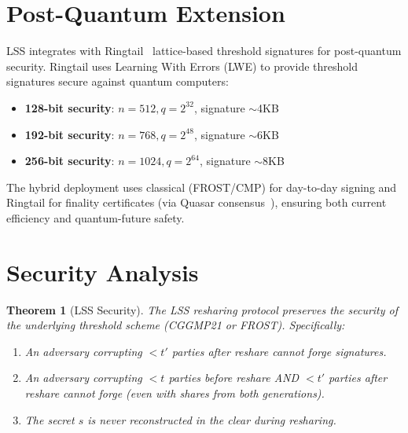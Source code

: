 \documentclass[11pt]{article}
\newtheorem{theorem}{Theorem}
\begin{document}
\section{Post-Quantum Extension}

LSS integrates with Ringtail~\cite{ringtail} lattice-based threshold signatures for post-quantum security. Ringtail uses Learning With Errors (LWE) to provide threshold signatures secure against quantum computers:

\begin{itemize}[nosep]
  \item \textbf{128-bit security}: $n = 512, q = 2^{32}$, signature $\sim$4KB
  \item \textbf{192-bit security}: $n = 768, q = 2^{48}$, signature $\sim$6KB
  \item \textbf{256-bit security}: $n = 1024, q = 2^{64}$, signature $\sim$8KB
\end{itemize}

The hybrid deployment uses classical (FROST/CMP) for day-to-day signing and Ringtail for finality certificates (via Quasar consensus~\cite{quasar}), ensuring both current efficiency and quantum-future safety.

\section{Security Analysis}

\begin{theorem}[LSS Security]
The LSS resharing protocol preserves the security of the underlying threshold scheme (CGGMP21 or FROST). Specifically:
\begin{enumerate}[nosep]
  \item An adversary corrupting $< t'$ parties after reshare cannot forge signatures.
  \item An adversary corrupting $< t$ parties before reshare AND $< t'$ parties after reshare cannot forge (even with shares from both generations).
  \item The secret $s$ is never reconstructed in the clear during resharing.
\end{enumerate}
\end{theorem}
\end{document}
